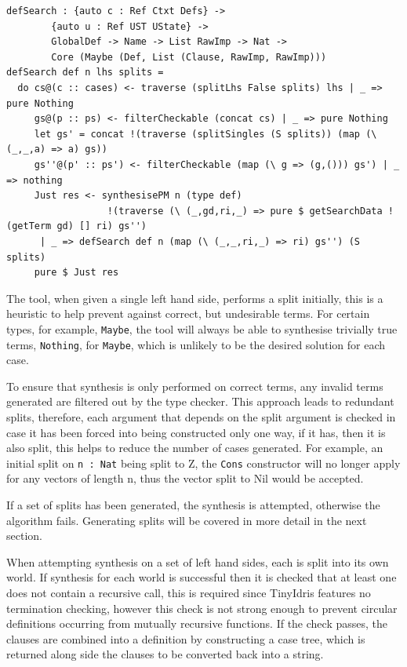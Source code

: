 \documentclass[a4paper]{article}
\begin{document}
\begin{center}
  \begin{verbatim}
defSearch : {auto c : Ref Ctxt Defs} ->
        {auto u : Ref UST UState} -> 
        GlobalDef -> Name -> List RawImp -> Nat ->
        Core (Maybe (Def, List (Clause, RawImp, RawImp)))
defSearch def n lhs splits = 
  do cs@(c :: cases) <- traverse (splitLhs False splits) lhs | _ => pure Nothing
     gs@(p :: ps) <- filterCheckable (concat cs) | _ => pure Nothing
     let gs' = concat !(traverse (splitSingles (S splits)) (map (\ (_,_,a) => a) gs)) 
     gs''@(p' :: ps') <- filterCheckable (map (\ g => (g,())) gs') | _ => nothing
     Just res <- synthesisePM n (type def)
                  !(traverse (\ (_,gd,ri,_) => pure $ getSearchData !(getTerm gd) [] ri) gs'')
      | _ => defSearch def n (map (\ (_,_,ri,_) => ri) gs'') (S splits) 
     pure $ Just res
  \end{verbatim}
\end{center}

The tool, when given a single left hand side, performs a split
initially, this is a heuristic to help prevent against correct,
but undesirable terms. For certain types, for example, \texttt{Maybe},
the tool will always be able to synthesise trivially true terms, \texttt{Nothing}, for \texttt{Maybe}, which
is unlikely to be the desired solution for each case.

To ensure that synthesis is only performed on
correct terms, any invalid terms generated are filtered out by the type checker.
This approach leads to redundant splits, therefore, each argument that depends
on the split argument is checked in case it has been forced into being constructed only
one way, if it has, then it is also split, this helps to reduce the number of
cases generated. For example, an initial split on \texttt{n : Nat} being split to Z, the \texttt{Cons}
constructor will no longer apply for any vectors of length n, thus the vector
split to Nil would be accepted.

If a set of splits has been generated, the synthesis is attempted, otherwise the
algorithm fails. Generating splits will be covered in more detail in the next section.

When attempting synthesis on a set of left hand sides, each is split into its own
world. If synthesis for each world is successful then it is checked that at least
one does not contain a recursive call, this is required since TinyIdris features no termination
checking, however this check is not strong enough to prevent circular definitions occurring from
mutually recursive functions. If the check passes, the clauses are combined into a definition
by constructing a case tree, which is returned along side the clauses to be converted back
into a string. 
\end{document}
